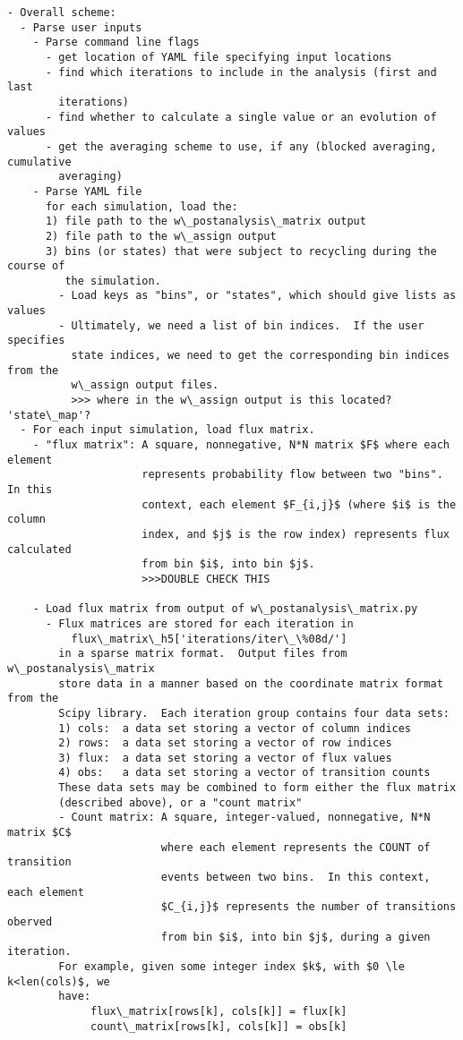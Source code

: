 \documentclass[10pt]{article}
\begin{document}
\maketitle

\begin{Verbatim}[commandchars=\\\{\},codes={\catcode`$=3\catcode`^=7\catcode`_=8}]
- Overall scheme:
  - Parse user inputs
    - Parse command line flags
      - get location of YAML file specifying input locations
      - find which iterations to include in the analysis (first and last 
        iterations)
      - find whether to calculate a single value or an evolution of values
      - get the averaging scheme to use, if any (blocked averaging, cumulative
        averaging) 
    - Parse YAML file
      for each simulation, load the:
      1) file path to the w\_postanalysis\_matrix output
      2) file path to the w\_assign output
      3) bins (or states) that were subject to recycling during the course of 
         the simulation.
        - Load keys as "bins", or "states", which should give lists as values
        - Ultimately, we need a list of bin indices.  If the user specifies
          state indices, we need to get the corresponding bin indices from the
          w\_assign output files.
          >>> where in the w\_assign output is this located? 'state\_map'? 
  - For each input simulation, load flux matrix.
    - "flux matrix": A square, nonnegative, N*N matrix $F$ where each element
                     represents probability flow between two "bins". In this 
                     context, each element $F_{i,j}$ (where $i$ is the column 
                     index, and $j$ is the row index) represents flux calculated
                     from bin $i$, into bin $j$.
                     >>>DOUBLE CHECK THIS

    - Load flux matrix from output of w\_postanalysis\_matrix.py
      - Flux matrices are stored for each iteration in 
          flux\_matrix\_h5['iterations/iter\_\%08d/']
        in a sparse matrix format.  Output files from w\_postanalysis\_matrix
        store data in a manner based on the coordinate matrix format from the 
        Scipy library.  Each iteration group contains four data sets:
        1) cols:  a data set storing a vector of column indices
        2) rows:  a data set storing a vector of row indices
        3) flux:  a data set storing a vector of flux values
        4) obs:   a data set storing a vector of transition counts
        These data sets may be combined to form either the flux matrix
        (described above), or a "count matrix"
        - Count matrix: A square, integer-valued, nonnegative, N*N matrix $C$ 
                        where each element represents the COUNT of transition 
                        events between two bins.  In this context, each element
                        $C_{i,j}$ represents the number of transitions oberved 
                        from bin $i$, into bin $j$, during a given iteration.
        For example, given some integer index $k$, with $0 \le k<len(cols)$, we
        have:
             flux\_matrix[rows[k], cols[k]] = flux[k]
             count\_matrix[rows[k], cols[k]] = obs[k]


\end{Verbatim}
\end{document}
